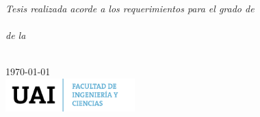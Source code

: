 \documentclass[
11pt, %
oneside, %
spanish, %
singlespacing, %
parskip, %
headsepline, %
table
]{MastersDoctoralThesis} %
\begin{document}
\begin{titlepage}
\begin{center}
\vfill

\large \textit{Tesis realizada acorde a los requerimientos para el grado de\\  \degreename}\\[0.3cm] %
\textit{de la}\\[0.4cm]
\facname\\[1.5cm] %
 
\vfill

{\large \today}\\[2cm] %
\includegraphics[width=5cm]{fic.png} %
 
\vfill
\end{center}
\end{titlepage}

\end{document}

